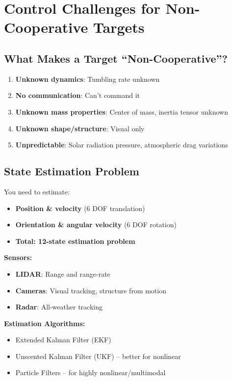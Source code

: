 \documentclass[11pt,a4paper]{article}
\begin{document}
\section{Control Challenges for Non-Cooperative Targets}

\subsection{What Makes a Target ``Non-Cooperative''?}

\begin{enumerate}
    \item \textbf{Unknown dynamics}: Tumbling rate unknown
    \item \textbf{No communication}: Can't command it
    \item \textbf{Unknown mass properties}: Center of mass, inertia tensor unknown
    \item \textbf{Unknown shape/structure}: Visual only
    \item \textbf{Unpredictable}: Solar radiation pressure, atmospheric drag variations
\end{enumerate}

\subsection{State Estimation Problem}

You need to estimate:
\begin{itemize}[leftmargin=*]
    \item \textbf{Position \& velocity} (6 DOF translation)
    \item \textbf{Orientation \& angular velocity} (6 DOF rotation)
    \item \textbf{Total: 12-state estimation problem}
\end{itemize}

\textbf{Sensors:}
\begin{itemize}[leftmargin=*]
    \item \textbf{LIDAR}: Range and range-rate
    \item \textbf{Cameras}: Visual tracking, structure from motion
    \item \textbf{Radar}: All-weather tracking
\end{itemize}

\textbf{Estimation Algorithms:}
\begin{itemize}[leftmargin=*]
    \item Extended Kalman Filter (EKF)
    \item Unscented Kalman Filter (UKF) -- better for nonlinear
    \item Particle Filters -- for highly nonlinear/multimodal
\end{itemize}
\end{document}
